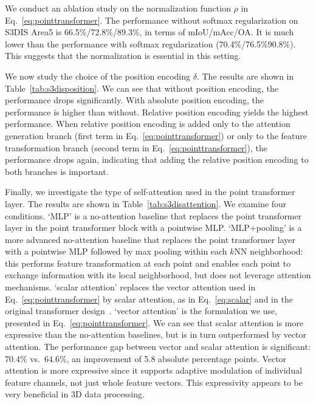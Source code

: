 We conduct an ablation study on the normalization function $\rho$ in Eq.~\ref{eq:pointtransformer}. The performance without softmax regularization on S3DIS Area5 is 66.5\%/72.8\%/89.3\%, in terms of mIoU/mAcc/OA. It is much lower than the performance with softmax regularization (70.4\%/76.5\%90.8\%). This suggests that the normalization is essential in this setting.

We now study the choice of the position encoding $\delta$. The results are shown in Table~\ref{tab:s3disposition}. We can see that without position encoding, the performance drops significantly. With absolute position encoding, the performance is higher than without. Relative position encoding yields the highest performance. When relative position encoding is added only to the attention generation branch (first term in Eq.~\ref{eq:pointtransformer}) or only to the feature transformation branch (second term in Eq.~\ref{eq:pointtransformer}), the performance drops again, indicating that adding the relative position encoding to both branches is important.

Finally, we investigate the type of self-attention used in the point transformer layer. The results are shown in Table~\ref{tab:s3disattention}. We examine four conditions. `MLP' is a no-attention baseline that replaces the point transformer layer in the point transformer block with a pointwise MLP. `MLP+pooling' is a more advanced no-attention baseline that replaces the point transformer layer with a pointwise MLP followed by max pooling within each $k$NN neighborhood: this performs feature transformation at each point and enables each point to exchange information with its local neighborhood, but does not leverage attention mechanisms.
`scalar attention' replaces the vector attention used in Eq.~\ref{eq:pointtransformer} by scalar attention, as in Eq.~\ref{eq:scalar} and in the original transformer design~\cite{vaswani2017attention}. `vector attention' is the formulation we use, presented in Eq.~\ref{eq:pointtransformer}. We can see that scalar attention is more expressive than the no-attention baselines, but is in turn outperformed by vector attention. The performance gap between vector and scalar attention is significant: 70.4\% vs.\ 64.6\%, an improvement of 5.8 absolute percentage points. Vector attention is more expressive since it supports adaptive modulation of individual feature channels, not just whole feature vectors. This expressivity appears to be very beneficial in 3D data processing.